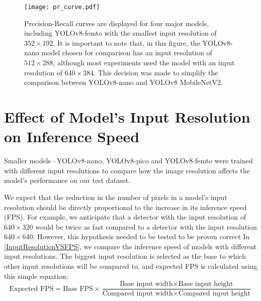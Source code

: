 
\begin{figure}[H]
    \begin{framed}
        \centering
        \texttt{[image: pr\_curve.pdf]}
        \caption{Precision-Recall curves are displayed for four major models,
        including YOLOv8-femto with the smallest input resolution of $352 \times 192$. It
        is important to note that, in this figure, the YOLOv8-nano model chosen for
        comparison has an input resolution of $512 \times 288$, although most experiments
        used the model with an input resolution of $640 \times 384$. This decision was
        made to simplify the comparison between YOLOv8-nano and YOLOv8 MobileNetV2.}
        \label{PRCurveMajor}
    \end{framed}
\end{figure}






\section{Effect of Model's Input Resolution on Inference Speed}
\label{InputResolutionVSFPSExperiment}

Smaller models\,--\,YOLOv8-nano, YOLOv8-pico and YOLOv8-femto were trained with
different input resolutions to compare how the image resolution affects
the model's performance on our test dataset.

We expect that the reduction in the number of pixels in a model's input resolution
should be directly proportional to the increase in its inference speed (FPS).
For example, we anticipate that a detector with the input resolution of $640 \times
320$ would be twice as fast compared to a detector with the input resolution $640
\times 640$. However, this hypothesis needed to be tested to be proven correct
In \autoref{InputResolutionVSFPS}, we compare the inference speed of models with
different input resolutions. The biggest input resolution is selected as the base to which
other input resolutions will be compared to, and expected FPS is calculated using
this simple equation:
\begin{equation}
    \text{Expected FPS} = \text{Base FPS} \times \frac{\text{Base input width} \times \text{Base input height}}{\text{Compared input width} \times \text{Compared input height}}
\end{equation}


